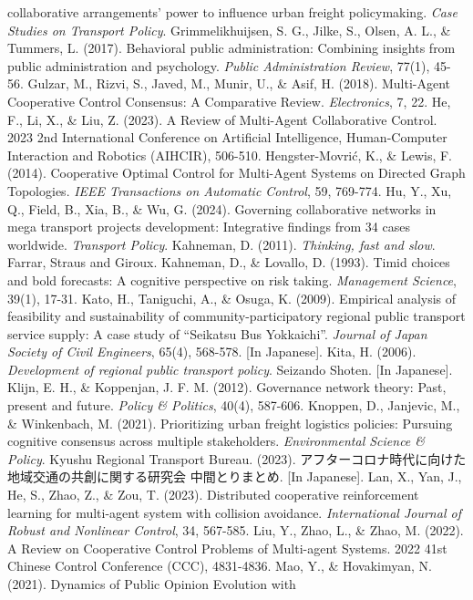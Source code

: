 collaborative arrangements' power to influence urban freight
policymaking. \emph{Case Studies on Transport Policy}. Grimmelikhuijsen,
S. G., Jilke, S., Olsen, A. L., \& Tummers, L. (2017). Behavioral public
administration: Combining insights from public administration and
psychology. \emph{Public Administration Review}, 77(1), 45-56. Gulzar,
M., Rizvi, S., Javed, M., Munir, U., \& Asif, H. (2018). Multi-Agent
Cooperative Control Consensus: A Comparative Review. \emph{Electronics},
7, 22. He, F., Li, X., \& Liu, Z. (2023). A Review of Multi-Agent
Collaborative Control. 2023 2nd International Conference on Artificial
Intelligence, Human-Computer Interaction and Robotics (AIHCIR), 506-510.
Hengster-Movrić, K., \& Lewis, F. (2014). Cooperative Optimal Control
for Multi-Agent Systems on Directed Graph Topologies. \emph{IEEE
Transactions on Automatic Control}, 59, 769-774. Hu, Y., Xu, Q., Field,
B., Xia, B., \& Wu, G. (2024). Governing collaborative networks in mega
transport projects development: Integrative findings from 34 cases
worldwide. \emph{Transport Policy}. Kahneman, D. (2011). \emph{Thinking,
fast and slow}. Farrar, Straus and Giroux. Kahneman, D., \& Lovallo, D.
(1993). Timid choices and bold forecasts: A cognitive perspective on
risk taking. \emph{Management Science}, 39(1), 17-31. Kato, H.,
Taniguchi, A., \& Osuga, K. (2009). Empirical analysis of feasibility
and sustainability of community-participatory regional public transport
service supply: A case study of ``Seikatsu Bus Yokkaichi''.
\emph{Journal of Japan Society of Civil Engineers}, 65(4), 568-578.
{[}In Japanese{]}. Kita, H. (2006). \emph{Development of regional public
transport policy}. Seizando Shoten. {[}In Japanese{]}. Klijn, E. H., \&
Koppenjan, J. F. M. (2012). Governance network theory: Past, present and
future. \emph{Policy \& Politics}, 40(4), 587-606. Knoppen, D.,
Janjevic, M., \& Winkenbach, M. (2021). Prioritizing urban freight
logistics policies: Pursuing cognitive consensus across multiple
stakeholders. \emph{Environmental Science \& Policy}. Kyushu Regional
Transport Bureau. (2023).
アフターコロナ時代に向けた地域交通の共創に関する研究会 中間とりまとめ.
{[}In Japanese{]}. Lan, X., Yan, J., He, S., Zhao, Z., \& Zou, T.
(2023). Distributed cooperative reinforcement learning for multi-agent
system with collision avoidance. \emph{International Journal of Robust
and Nonlinear Control}, 34, 567-585. Liu, Y., Zhao, L., \& Zhao, M.
(2022). A Review on Cooperative Control Problems of Multi-agent Systems.
2022 41st Chinese Control Conference (CCC), 4831-4836. Mao, Y., \&
Hovakimyan, N. (2021). Dynamics of Public Opinion Evolution with
